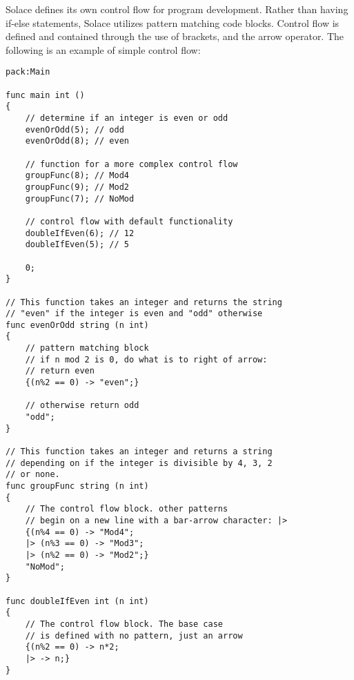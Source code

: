 \documentclass{article}
\begin{document}
Solace defines its own control flow for program development. Rather than having if-else
statements, Solace utilizes pattern matching code blocks. Control flow is defined and
contained through the use of brackets, and the arrow operator. The following is an example
of simple control flow:

\begin{lstlisting}
pack:Main

func main int ()
{
	// determine if an integer is even or odd
	evenOrOdd(5); // odd
	evenOrOdd(8); // even
	
	// function for a more complex control flow
	groupFunc(8); // Mod4
	groupFunc(9); // Mod2
	groupFunc(7); // NoMod
	
	// control flow with default functionality
	doubleIfEven(6); // 12
	doubleIfEven(5); // 5
	
	0;
}

// This function takes an integer and returns the string
// "even" if the integer is even and "odd" otherwise
func evenOrOdd string (n int)
{
	// pattern matching block
	// if n mod 2 is 0, do what is to right of arrow:
	// return even
	{(n%2 == 0) -> "even";}
	
	// otherwise return odd
	"odd";
}

// This function takes an integer and returns a string
// depending on if the integer is divisible by 4, 3, 2
// or none.
func groupFunc string (n int)
{
	// The control flow block. other patterns
	// begin on a new line with a bar-arrow character: |>
	{(n%4 == 0) -> "Mod4";
	|> (n%3 == 0) -> "Mod3";
	|> (n%2 == 0) -> "Mod2";}
	"NoMod";
}

func doubleIfEven int (n int)
{
	// The control flow block. The base case
	// is defined with no pattern, just an arrow
	{(n%2 == 0) -> n*2;
	|> -> n;}
}

\end{lstlisting}
\end{document}
